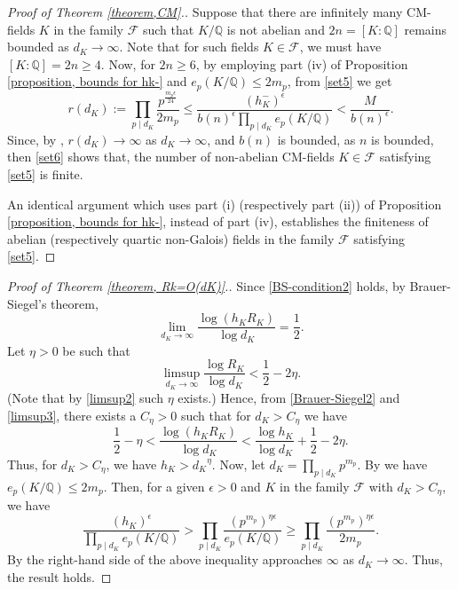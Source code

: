 \documentclass[12pt]{amsart}
\theoremstyle{definition}
\numberwithin{equation}{section}
\begin{document}
\begin{proof}[Proof of Theorem \ref{theorem,CM}.]
Suppose that there are infinitely many CM-fields $K$ in the family $\mathcal{F}$ such that $K/\mathbb{Q}$ is not abelian and $ 2n=[K:\mathbb{Q}]$ remains bounded as $d_K \rightarrow \infty$. 
Note that for such fields $K \in \mathcal{F}$, we must have $[K:\mathbb{Q}]=2n \geq 4$. Now, for $2n \geq 6$, by employing part (iv) of 
Proposition \ref{proposition, bounds for hk-} and 
$e_p(K/\mathbb{Q})\leq 2m_p$, from \eqref{set5} we get
\begin{equation}
\label{set6}
r(d_K):= \prod_{p \mid d_K} \frac{p^{\frac{m_p \epsilon}{24}} }{2m_p} \leq \frac{(h_K^-)^{\epsilon}}{b(n)^{\epsilon}\prod_{p \mid d_K} e_p(K/\mathbb{Q})} <\frac{M}{b(n)^\epsilon}.
\end{equation}
Since, by \cite[Theorem 316]{Hardy}, $r(d_K) \rightarrow \infty$ as $d_K\rightarrow \infty$, and  $b(n)$ is bounded, as $n$ is bounded, then \eqref{set6} shows that, the number of non-abelian CM-fields $K \in \mathcal{F}$ satisfying \eqref{set5} is finite. 

An identical argument which uses part (i) (respectively part (ii)) of 
Proposition \ref{proposition, bounds for hk-},  instead of part (iv), establishes the finiteness of abelian  (respectively quartic non-Galois) fields in the family $\mathcal{F}$ satisfying \eqref{set5}.
\end{proof}


\begin{proof}[Proof of Theorem \ref{theorem, Rk=O(dK)}.]
Since \eqref{BS-condition2} holds, by Brauer-Siegel's theorem,
\begin{equation}
\label{Brauer-Siegel2}
\lim_{d_K \rightarrow \infty} \frac{\log (h_K R_K)}{\log{d_K}}=\frac{1}{2}.		
\end{equation}
Let $\eta>0$ be such that 
\begin{equation}
\label{limsup3}
\limsup_{d_K\rightarrow \infty} \frac{\log{R_K}}{\log{d_K}}<\frac{1}{2}-2\eta.
\end{equation}
(Note that by \eqref{limsup2} such $\eta$ exists.)
Hence, from \eqref{Brauer-Siegel2} and \eqref{limsup3}, there exists a $C_{\eta}>0$ such that for $d_K>C_{\eta}$ we have
\begin{equation*}
\frac{1}{2}-\eta <\frac{\log {(h_K R_K)}}{\log{d_K}}<\frac{\log {h_K}}{\log{d_K}} +\frac{1}{2}-2\eta.
\end{equation*}
Thus, for $d_K > C_{\eta}$, we have $h_K > {d_K}^{\eta}$. Now, let 
	$d_K=\prod_{p \mid d_K} p ^{m_p}.$
By \cite[Chapter III, Proposition 8]{Lang} we have 
$e_p(K/\mathbb{Q})\leq 2m_p$.
Then, for a given $\epsilon>0$ and $K$ in the family $\mathcal{F}$  with $d_K>C_{\eta}$, we have
\begin{equation*}
\frac{(h_K)^{\epsilon}}{\prod_{p \mid d_K} e_p(K/\mathbb{Q})} > \prod_{p \mid d_K} \frac{(p^{m_p})^{\eta \epsilon}}{e_p(K/\mathbb{Q})} \geq  \prod_{p \mid d_K} \frac{(p^{m_p})^{\eta \epsilon}}{2 m_p}.
\end{equation*}
By \cite[Theorem 316]{Hardy} the right-hand side of the above inequality approaches $\infty$ as $d_K \rightarrow \infty$. Thus, the result holds.
\end{proof}
\end{document}
